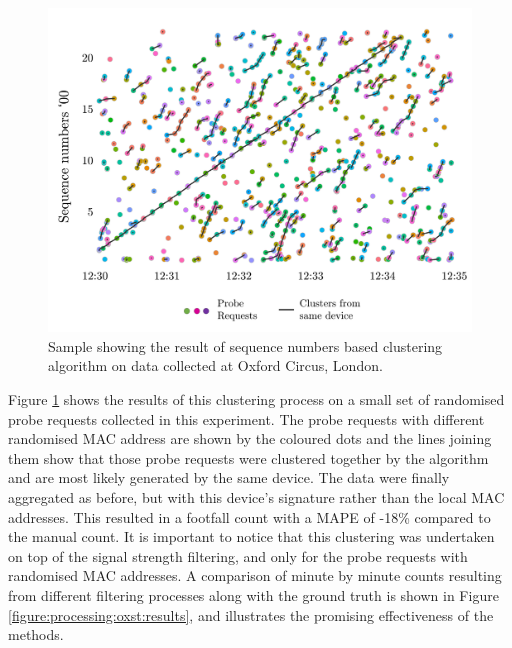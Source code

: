 \begin{figure}
  \includegraphics[trim={3 3 3 3},clip]{images/processing-oxst-fingerprinting.jpg}
  \caption{Sample showing the result of sequence numbers based clustering algorithm on data collected at Oxford Circus, London.}
  \label{figure:processing:oxst:fingerprinting}
\end{figure}

Figure \ref{figure:processing:oxst:fingerprinting} shows the results of this clustering process on a small set of randomised probe requests collected in this experiment.
The probe requests with different randomised MAC address are shown by the coloured dots and the lines joining them show that those probe requests were clustered together by the algorithm and are most likely generated by the same device.
The data were finally aggregated as before, but with this device’s signature rather than the local MAC addresses.
This resulted in a footfall count with a MAPE of -18\% compared to the manual count.
It is important to notice that this clustering was undertaken on top of the signal strength filtering, and only for the probe requests with randomised MAC addresses.
A comparison of minute by minute counts resulting from different filtering processes along with the ground truth is shown in Figure \ref{figure:processing:oxst:results}, and illustrates the promising effectiveness of the methods.


